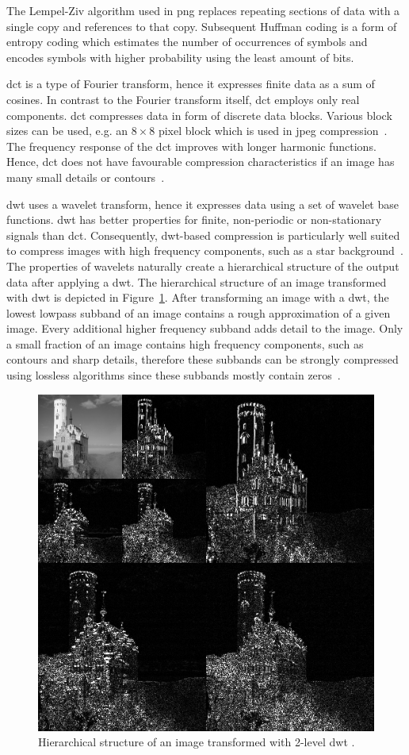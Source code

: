 The Lempel-Ziv algorithm used in \gls{png} replaces repeating sections of data with a single copy and references to that copy. Subsequent Huffman coding is a form of entropy coding which estimates the number of occurrences of symbols and encodes symbols with higher probability using the least amount of bits.

\Gls{dct} is a type of Fourier transform, hence it expresses finite data as a sum of cosines. In contrast to the Fourier transform itself, \gls{dct} employs only real components. \Gls{dct} compresses data in form of discrete data blocks. Various block sizes can be used, e.g. an $8\times8$ pixel block which is used in \gls{jpeg} compression~\cite{Bocharova2009CompressionMultimedia}. The frequency response of the \gls{dct} improves with longer harmonic functions. Hence, \gls{dct} does not have favourable compression characteristics if an image has many small details or contours~\cite{Bocharova2009CompressionMultimedia}.

\Gls{dwt} uses a wavelet transform, hence it expresses data using a set of wavelet base functions. \Gls{dwt} has better properties for finite, non-periodic or non-stationary signals than \gls{dct}. Consequently, \gls{dwt}-based compression is particularly well suited to compress images with high frequency components, such as a star background~\cite{Bocharova2009CompressionMultimedia}. The properties of wavelets naturally create a hierarchical structure of the output data after applying a \gls{dwt}. The hierarchical structure of an image transformed with \gls{dwt} is depicted in Figure~\ref{fig:jp2_hierarchy}. After transforming an image with a \gls{dwt}, the lowest lowpass subband of an image contains a rough approximation of a given image. Every additional higher frequency subband adds detail to the image. Only a small fraction of an image contains high frequency components, such as contours and sharp details, therefore these subbands can be strongly compressed using lossless algorithms since these subbands mostly contain zeros~\cite{Bocharova2009CompressionMultimedia}.
\begin{figure}[htb]
    \centering
        \includegraphics[width=.65\textwidth]{doc/thesis/0_figures/jp2_jpeg/Jpeg2000_2-level_wavelet_transform-lichtenstein.png}
        \caption{Hierarchical structure of an image transformed with 2-level \gls{dwt} \cite{Commons20192-levelTransform-lichtenstein}.}
        \label{fig:jp2_hierarchy}
\end{figure}

